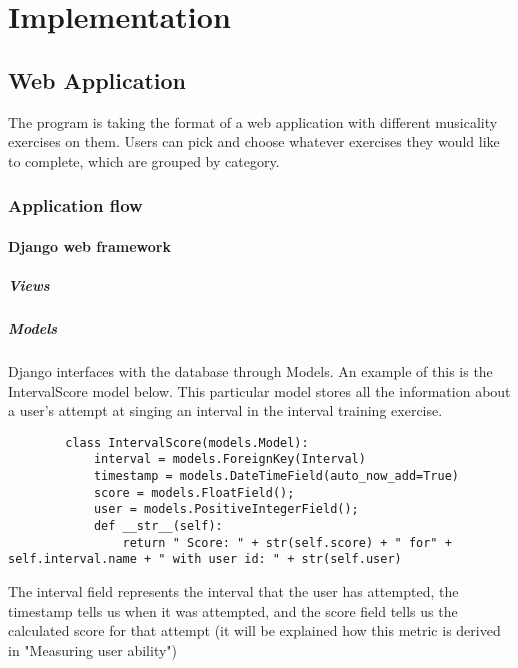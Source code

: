 \chapter{Implementation}
\section{Web Application}
The program is taking the format of a web application with different musicality exercises on them. Users can pick and choose whatever exercises they would like to complete, which are grouped by category.
\subsection{Application flow}
	\subsubsection{Django web framework}
		\paragraph{Views}
		\paragraph{Models}
		Django interfaces with the database through Models. An example of this is the IntervalScore model below. This particular model stores all the information about a user's attempt at singing an interval in the interval training exercise.
		\begin{verbatim}
		class IntervalScore(models.Model):
   			interval = models.ForeignKey(Interval) 
    		timestamp = models.DateTimeField(auto_now_add=True)
    		score = models.FloatField();
		    user = models.PositiveIntegerField();
		    def __str__(self):
        		return " Score: " + str(self.score) + " for" + self.interval.name + " with user id: " + str(self.user)

		\end{verbatim}
		The interval field represents the interval that the user has attempted, the timestamp tells us when it was attempted, and the score field tells us the calculated score for that attempt (it will be explained how this metric is derived in "Measuring user ability")
		
